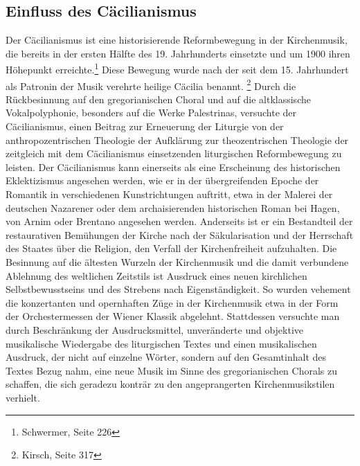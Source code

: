 \documentclass[a4paper]{article}
\newcommand\textstyleFootnoteSymbol[1]{\textsuperscript{#1}}
\begin{document}
\clearpage\subsection{Einfluss des Cäcilianismus}
\hypertarget{RefHeadingToc100333748}{}Der Cäcilianismus ist eine
historisierende Reformbewegung in der Kirchenmusik, die bereits in der
ersten Hälfte des 19. Jahrhunderts einsetzte und um 1900 ihren
Höhepunkt erreichte.\footnote{ Schwermer, Seite 226} Diese Bewegung
wurde nach der seit dem 15. Jahrhundert als Patronin der Musik verehrte
heilige Cäcilia benannt.\textstyleFootnoteSymbol{ }\footnote{ Kirsch,
Seite 317} Durch die Rückbesinnung auf den gregorianischen Choral und
auf die altklassische Vokalpolyphonie, besonders auf die Werke
Palestrinas, versuchte der Cäcilianismus, einen Beitrag zur Erneuerung
der Liturgie von der anthropozentrischen Theologie der Aufklärung zur
theozentrischen Theologie der zeitgleich mit dem Cäcilianismus
einsetzenden liturgischen Reformbewegung zu leisten. Der Cäcilianismus
kann einerseits als eine Erscheinung des historischen Eklektizismus
angesehen werden, wie er in der übergreifenden Epoche der Romantik in
verschiedenen Kunstrichtungen auftritt, etwa in der Malerei der
deutschen Nazarener oder dem archaisierenden historischen Roman bei
Hagen, von Arnim oder Brentano angesehen werden. Anderseits ist er ein
Bestandteil der restaurativen Bemühungen der Kirche nach der
Säkularisation und der Herrschaft des Staates über die Religion, den
Verfall der Kirchenfreiheit aufzuhalten. Die Besinnung auf die ältesten
Wurzeln der Kirchenmusik und die damit verbundene Ablehnung des
weltlichen Zeitstils ist Ausdruck eines neuen kirchlichen
Selbstbewusstseins und des Strebens nach Eigenständigkeit. So wurden
vehement die konzertanten und opernhaften Züge in der Kirchenmusik etwa
in der Form der Orchestermessen der Wiener Klassik abgelehnt.
Stattdessen versuchte man durch Beschränkung der Ausdrucksmittel,
unveränderte und objektive musikalische Wiedergabe des liturgischen
Textes und einen musikalischen Ausdruck, der nicht auf einzelne Wörter,
sondern auf den Gesamtinhalt des Textes Bezug nahm, eine neue Musik im
Sinne des gregorianischen Chorals zu schaffen, die sich geradezu
konträr zu den angeprangerten Kirchenmusikstilen verhielt.
\end{document}
